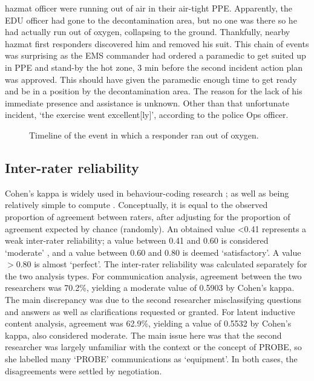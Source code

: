 \documentclass[link]{IWCOMP}
\begin{document}
hazmat officer were running out of air in their air-tight PPE. Apparently,
the EDU officer had gone to the decontamination area, but no one was there
so he had actually run out of oxygen, collapsing to the ground. Thankfully,
nearby hazmat first responders discovered him and removed his suit. This
chain of events was surprising as the EMS commander had ordered a paramedic
to get suited up in PPE and stand-by the hot zone, 3 min before the second
incident action plan was approved. This should have given the paramedic
enough time to get ready and be in a position by the decontamination area.
The reason for the lack of his immediate presence and assistance is unknown.
Other than that unfortunate incident, `the exercise went excellent[ly]',
according to the police Ops officer.

\begin{figure}[]
\centerline{}
\caption{Timeline of the event in which a responder ran out of
oxygen.\label{fig4}}\vspace*{-3pt}
\end{figure}

\subsection{Inter-rater reliability}\label{subsec4.4}

Cohen's kappa \citep{bib5} is widely used in behaviour-coding research
\citep{bib2}; \citep{bib4} as well as being relatively simple to
compute \citep{bib23}. Conceptually, it is equal to the observed
proportion of agreement between raters, after adjusting for the proportion
of agreement expected by chance (randomly). An obtained value <0.41
represents a weak inter-rater reliability; a value between 0.41 and 0.60 is
considered `moderate' \citep{bib4}, and a value between 0.60 and
0.80 is deemed `satisfactory'. A value $>$0.80 is almost
`perfect'. The inter-rater reliability was calculated separately for the two
analysis types. For communication analysis, agreement between the two
researchers was 70.2{\%}, yielding a moderate value of 0.5903 by Cohen's
kappa. The main discrepancy was due to the second researcher misclassifying
questions and answers as well as clarifications requested or granted. For
latent inductive content analysis, agreement was 62.9{\%}, yielding a value
of 0.5532 by Cohen's kappa, also considered moderate. The main issue here
was that the second researcher was largely unfamiliar with the context or
the concept of PROBE, so she labelled many `PROBE' communications as
`equipment'. In both cases, the disagreements were settled by negotiation.
\end{document}
